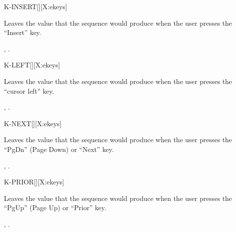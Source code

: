 \begin{worddef*}{}{K-INSERT}[][X:ekeys]
\item {}

	Leaves the value  that the sequence 
	 would produce when the user presses the
	``Insert'' key.


\see {},
	.
\end{worddef*}


\begin{worddef*}{}{K-LEFT}[][X:ekeys]
\item {}

	Leaves the value  that the sequence 
	 would produce when the user presses the
	``cursor left'' key.


\see {},
	.
\end{worddef*}


\begin{worddef*}{}{K-NEXT}[][X:ekeys]
\item {}

	Leaves the value  that the sequence 
	 would produce when the user presses the
	``PgDn'' (Page Down) or ``Next'' key.


\see {},
	.
\end{worddef*}


\begin{worddef*}{}{K-PRIOR}[][X:ekeys]
\item {}

	Leaves the value  that the sequence 
	 would produce when the user presses the
	``PgUp'' (Page Up) or ``Prior'' key.


\see {},
	.
\end{worddef*}


